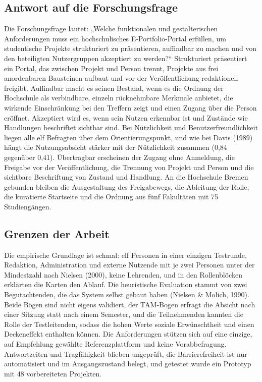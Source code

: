 \subsection{Antwort auf die Forschungsfrage}
\label{subsec:antwort-ff}

Die Forschungsfrage lautet: „Welche funktionalen und gestalterischen Anforderungen muss ein hochschulisches E-Portfolio-Portal erfüllen, um studentische Projekte strukturiert zu präsentieren, auffindbar zu machen und von den beteiligten Nutzergruppen akzeptiert zu werden?“ Strukturiert präsentiert ein Portal, das zwischen Projekt und Person trennt, Projekte aus frei anordenbaren Bausteinen aufbaut und vor der Veröffentlichung redaktionell freigibt. Auffindbar macht es seinen Bestand, wenn es die Ordnung der Hochschule als verbindbare, einzeln rücknehmbare Merkmale anbietet, die wirkende Einschränkung bei den Treffern zeigt und einen Zugang über die Person eröffnet. Akzeptiert wird es, wenn sein Nutzen erkennbar ist und Zustände wie Handlungen beschriftet sichtbar sind. Bei Nützlichkeit und Benutzerfreundlichkeit liegen alle elf Befragten über dem Orientierungspunkt, und wie bei Davis (1989) hängt die Nutzungsabsicht stärker mit der Nützlichkeit zusammen (0,84 gegenüber 0,41). Übertragbar erscheinen der Zugang ohne Anmeldung, die Freigabe vor der Veröffentlichung, die Trennung von Projekt und Person und die sichtbare Beschriftung von Zustand und Handlung. An die Hochschule Bremen gebunden bleiben die Ausgestaltung des Freigabewegs, die Ableitung der Rolle, die kuratierte Startseite und die Ordnung aus fünf Fakultäten mit 75 Studiengängen.

\subsection{Grenzen der Arbeit}
\label{subsec:grenzen}

Die empirische Grundlage ist schmal: elf Personen in einer einzigen Testrunde, Redaktion, Administration und externe Nutzende mit je zwei Personen unter der Mindestzahl nach Nielsen (2000), keine Lehrenden, und in den Rollenblöcken erklärten die Karten den Ablauf. Die heuristische Evaluation stammt von zwei Begutachtenden, die das System selbst gebaut haben (Nielsen \& Molich, 1990). Beide Bögen sind nicht eigens validiert, der TAM-Bogen erfragt die Absicht nach einer Sitzung statt nach einem Semester, und die Teilnehmenden kannten die Rolle der Testleitenden, sodass die hohen Werte soziale Erwünschtheit und einen Deckeneffekt enthalten können. Die Anforderungen stützen sich auf eine einzige, auf Empfehlung gewählte Referenzplattform und keine Vorabbefragung. Antwortzeiten und Tragfähigkeit blieben ungeprüft, die Barrierefreiheit ist nur automatisiert und im Ausgangszustand belegt, und getestet wurde ein Prototyp mit 48 vorbereiteten Projekten.

